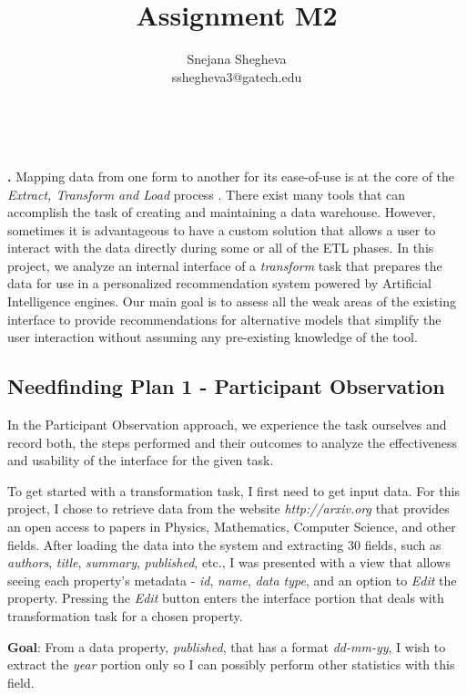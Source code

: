 \documentclass[12pt,letterpaper]{article}
\makeatletter
\renewcommand{\maketitle}{\bgroup
   \begin{center}
   \textbf{{\fontsize{18pt}{20}\selectfont \@title}}\\
   \vspace{10pt}
   {\fontsize{12pt}{0}\selectfont \@author} 
   \end{center}
}
\newenvironment{myquote}[1]%
  {\list{}{\leftmargin=#1\rightmargin=#1}\item[]}%
  {\endlist}
\renewenvironment{abstract}
{\vspace*{-.5in}\fontsize{12pt}{12}\begin{myquote}{.5in}
\noindent \par{\bfseries \abstractname.}}
{\medskip\noindent
\end{myquote}
}
\makeatother
\begin{document}
\title{Assignment M2}
\author{Snejana Shegheva \\ sshegheva3@gatech.edu}

\maketitle
\thispagestyle{fancy}

\begin{abstract}
Mapping data from one form to another for its ease-of-use is at the core of the \textit{Extract, Transform and Load} process \cite{wiki:etl}. There exist many tools that can accomplish the task of creating and maintaining a data warehouse. However, sometimes it is advantageous to have a custom solution that allows a user to interact with the data directly during some or all of the ETL phases. In this project, we analyze an internal interface of a \textit{transform} task that prepares the data for use in a personalized recommendation system powered by Artificial Intelligence engines. Our main goal is to assess all the weak areas of the existing interface to provide recommendations for alternative models that simplify the user interaction without assuming any pre-existing knowledge of the tool.
\end{abstract}

\subsection*{Needfinding Plan 1 - Participant Observation}
In the Participant Observation approach, we experience the task ourselves and record both, the steps performed and their outcomes to analyze the effectiveness and usability of the interface for the given task. 

To get started with a transformation task, I first need to get input data. For this project, I chose to retrieve data from the website \textit{http://arxiv.org} that provides an open access to papers in Physics, Mathematics, Computer Science, and other fields. After loading the data into the system and extracting 30 fields, such as \textit{authors}, \textit{title}, \textit{summary}, \textit{published}, etc., I was presented with a view that allows seeing each property's metadata - \textit{id}, \textit{name}, \textit{data type}, and an option to \textit{Edit} the property. Pressing the \textit{Edit} button enters the interface portion that deals with transformation task for a chosen property.    

\textbf{Goal}: From a data property, \textit{published}, that has a format \textit{dd-mm-yy}, I wish to extract the \textit{year} portion only so I can possibly perform other statistics with this field. 
\end{document}
